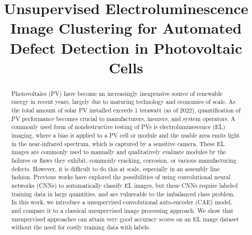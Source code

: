 \documentclass[conference]{IEEEtran}
\date{}
\begin{document}
\title{Unsupervised Electroluminescence Image Clustering for Automated Defect Detection in Photovoltaic Cells}
	
        

        

 \author{
 	}

\maketitle
\begin{abstract}

Photovoltaics (PV) have become an increasingly inexpensive source of renewable energy in recent years, largely due to maturing technology and economies of scale. 
As the total amount of solar PV installed exceeds 1 terawatt (as of 2022), quantification of PV performance becomes crucial to manufacturers, insurers, and system operators. 
A commonly used form of nondestructive testing of PVs is electroluminescence (EL) imaging, where a bias is applied to a PV cell or module and the usable area emits light in the near-infrared spectrum, which is captured by a sensitive camera. 
These EL images are commonly used to manually and qualitatively evaluate modules by the failures or flaws they exhibit, commonly cracking, corrosion, or various manufacturing defects. 
However, it is difficult to do this at scale, especially in an assembly line fashion. 
Previous works have explored the possibilities of using convolutional neural networks (CNNs) to automatically classify EL images, but these CNNs require labeled training data in large quantities, and are vulnerable to the imbalanced class problem. 
In this work, we introduce a unsupervised convolutional auto-encoder (CAE) model, and compare it to a classical unsupervised image processing approach. 
We show that unsupervised approaches can attain very good accuracy scores on an EL image dataset without the need for costly training data with labels.
\end{abstract}
\end{document}
